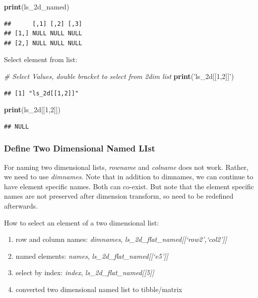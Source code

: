 \documentclass[
]{book}
\newenvironment{Shaded}{\begin{snugshade}}{\end{snugshade}}
\newcommand{\CommentTok}[1]{\textcolor[rgb]{0.56,0.35,0.01}{\textit{#1}}}
\newcommand{\DecValTok}[1]{\textcolor[rgb]{0.00,0.00,0.81}{#1}}
\newcommand{\KeywordTok}[1]{\textcolor[rgb]{0.13,0.29,0.53}{\textbf{#1}}}
\newcommand{\NormalTok}[1]{#1}
\newcommand{\StringTok}[1]{\textcolor[rgb]{0.31,0.60,0.02}{#1}}
\providecommand{\tightlist}{%
  \setlength{\itemsep}{0pt}\setlength{\parskip}{0pt}}
\begin{document}
\begin{Shaded}
\begin{Highlighting}[]
\KeywordTok{print}\NormalTok{(ls_2d_named)}
\end{Highlighting}
\end{Shaded}

\begin{verbatim}
##      [,1] [,2] [,3]
## [1,] NULL NULL NULL
## [2,] NULL NULL NULL
\end{verbatim}

Select element from list:

\begin{Shaded}
\begin{Highlighting}[]
\CommentTok{# Select Values, double bracket to select from 2dim list}
\KeywordTok{print}\NormalTok{(}\StringTok{'ls_2d[[1,2]]'}\NormalTok{)}
\end{Highlighting}
\end{Shaded}

\begin{verbatim}
## [1] "ls_2d[[1,2]]"
\end{verbatim}

\begin{Shaded}
\begin{Highlighting}[]
\KeywordTok{print}\NormalTok{(ls_2d[[}\DecValTok{1}\NormalTok{,}\DecValTok{2}\NormalTok{]])}
\end{Highlighting}
\end{Shaded}

\begin{verbatim}
## NULL
\end{verbatim}

\hypertarget{define-two-dimensional-named-list}{%
\subsubsection{Define Two Dimensional Named LIst}\label{define-two-dimensional-named-list}}

For naming two dimensional lists, \emph{rowname} and \emph{colname} does not work. Rather, we need to use \emph{dimnames}. Note that in addition to dimnames, we can continue to have element specific names. Both can co-exist. But note that the element specific names are not preserved after dimension transform, so need to be redefined afterwards.

How to select an element of a two dimensional list:

\begin{enumerate}
\def\labelenumi{\arabic{enumi}.}
\tightlist
\item
  row and column names: \emph{dimnames}, \emph{ls\_2d\_flat\_named{[}{[}`row2',`col2'{]}{]}}
\item
  named elements: \emph{names}, \emph{ls\_2d\_flat\_named{[}{[}`e5'{]}{]}}
\item
  select by index: \emph{index}, \emph{ls\_2d\_flat\_named{[}{[}5{]}{]}}
\item
  converted two dimensional named list to tibble/matrix
\end{enumerate}
\end{document}

